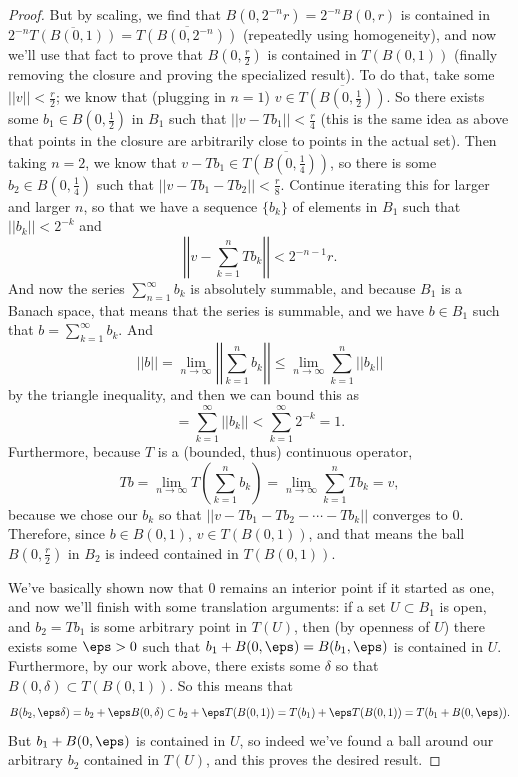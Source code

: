 \begin{proof}
But by scaling, we find that $B(0, 2^{-n}r) = 2^{-n}B(0, r)$ is contained in $2^{-n} \overline{T(B(0, 1))} = \overline{T(B(0, 2^{-n}))}$ (repeatedly using homogeneity), and now we'll use that fact to prove that $B(0, \frac{r}{2})$ is contained in $T(B(0, 1))$ (finally removing the closure and proving the specialized result). To do that, take some $||v|| < \frac{r}{2}$; we know that (plugging in $n=1$) $v \in \overline{T(B(0, \frac{1}{2}))}$. So there exists some $b_1 \in B(0, \frac{1}{2})$ in $B_1$ such that $||v - Tb_1|| < \frac{r}{4}$ (this is the same idea as above that points in the closure are arbitrarily close to points in the actual set). Then taking $n = 2$, we know that $v - Tb_1 \in \overline{T(B(0, \frac{1}{4}))}$, so there is some $b_2 \in B(0, \frac{1}{4})$ such that $||v - Tb_1 - Tb_2|| < \frac{r}{8}$. Continue iterating this for larger and larger $n$, so that we have a sequence $\{b_k\}$ of elements in $B_1$ such that $||b_k|| < 2^{-k}$ and 
\[
    \left|\left|v - \sum_{k=1}^n Tb_k\right|\right| < 2^{-n-1}r.
\]
And now the series $\sum_{n=1}^{\infty} b_k$ is absolutely summable, and because $B_1$ is a Banach space, that means that the series is summable, and we have $b \in B_1$ such that $b = \sum_{k=1}^{\infty} b_k$. And 
\[
    ||b|| = \lim_{n \to \infty} \left|\left|\sum_{k=1}^n b_k\right|\right| \le \lim_{n \to \infty} \sum_{k=1}^n ||b_k||
\]
by the triangle inequality, and then we can bound this as 
\[
    = \sum_{k=1}^{\infty} ||b_k|| < \sum_{k=1}^{\infty} 2^{-k} = 1.
\]
Furthermore, because $T$ is a (bounded, thus) continuous operator, 
\[
    Tb = \lim_{n \to \infty} T\left(\sum_{k=1}^n b_k\right) = \lim_{n \to \infty} \sum_{k=1}^n Tb_k = v,
\]
because we chose our $b_k$ so that $||v - Tb_1 - Tb_2 - \cdots - Tb_k||$ converges to $0$. Therefore, since $b \in B(0, 1)$, $v \in T(B(0, 1))$, and that means the ball $B(0, \frac{r}{2})$ in $B_2$ is indeed contained in $T(B(0, 1))$.

We've basically shown now that $0$ remains an interior point if it started as one, and now we'll finish with some translation arguments: if a set $U \subset B_1$ is open, and $b_2 = Tb_1$ is some arbitrary point in $T(U)$, then (by openness of $U$) there exists some $\eps > 0$ such that $b_1 + B(0, \eps) = B(b_1, \eps)$ is contained in $U$. Furthermore, by our work above, there exists some $\delta$ so that $B(0, \delta) \subset T(B(0, 1))$. So this means that 
\[
    B(b_2, \eps \delta) = b_2 + \eps B(0, \delta) \subset b_2 + \eps T(B(0, 1)) = T(b_1) + \eps T(B(0, 1)) = T(b_1 + B(0, \eps)).
\]
But $b_1 + B(0, \eps)$ is contained in $U$, so indeed we've found a ball around our arbitrary $b_2$ contained in $T(U)$, and this proves the desired result.
\end{proof}

